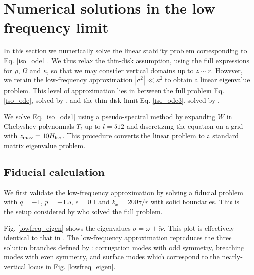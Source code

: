 \section{Numerical solutions in the low frequency limit}
In this section we numerically solve the linear stability problem
corresponding to Eq. \ref{iso_ode1}. We thus relax the thin-disk
assumption, using the full expressions for $\rho$, $\Omega$ and
$\kappa$, so that we may consider vertical domains up to $z\sim r$.
However, we retain the low-frequency approximation
$|\sigma^2|\ll\kappa^2$ to obtain a linear eigenvalue problem. This
level of approximation lies in between the full problem 
Eq. \ref{iso_ode}, solved by \cite{mcnally14}, and the thin-disk
limit Eq. \ref{iso_ode3}, solved by \cite{nelson13}.   

We solve Eq. \ref{iso_ode1} using a pseudo-spectral method by
expanding $W$ in Chebyshev polynomials $T_l$ up to $l=512$ and
discretizing the equation on a grid with
$z_\mathrm{max}=10H_\mathrm{iso}$. This procedure converts the linear problem
to a standard matrix eigenvalue problem. %

\subsection{Fiducial calculation}
We first validate the low-frequency approximation by solving a 
fiducial problem with $q=-1$, $p=-1.5$, $\epsilon=0.1$ and $k_x =
200\pi/r$ with solid boundaries. This is the setup considered by
\cite{mcnally14} who solved the full problem. 

Fig. \ref{lowfreq_eigen} shows the eigenvalues $\sigma = \omega +
\ii\nu$. This plot is effectively identical to that in
\cite{mcnally14}. The low-frequency approximation reproduces the
three solution branches defined by \citep{nelson13}: corrugation modes
with odd symmetry, breathing modes with even symmetry, and surface
modes which correspond to the nearly-vertical locus in
Fig. \ref{lowfreq_eigen}. 

